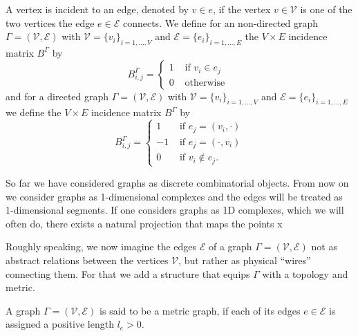 A vertex is incident to an edge, denoted by $v \in e$, if the vertex $v \in \mathcal{V}$ is one of the two vertices the edge $e \in \mathcal{E}$ connects. We define for an non-directed graph $\Gamma = (\mathcal{V}, \mathcal{E})$ with $\mathcal{V} = \{v_i\}_{i = 1, \ldots, V}$ and $\mathcal{E} = \{e_i\}_{i = 1, \ldots, E}$ the $V \times E$ incidence matrix $B^{\Gamma}$ by  
\begin{equation}
    \label{incidence matrix non-directed}
    B^{\Gamma}_{i, j}= \begin{cases} 1 & \text { if } v_i \in e_j \\ 0 & \text { otherwise } \end{cases}
\end{equation}
and for a directed graph $\Gamma = (\mathcal{V}, \mathcal{E})$ with $\mathcal{V} = \{v_i\}_{i = 1, \ldots, V}$ and $\mathcal{E} = \{e_i\}_{i = 1, \ldots, E}$ we define the $V \times E$ incidence matrix $B^{\Gamma}$ by 
\begin{equation}
    \label{incidence matrix directed}
    B^{\Gamma}_{i, j}= \begin{cases} 1 & \text { if } e_j = (v_i, \cdot) \\ -1 & \text { if } e_j = (\cdot, v_i) \\ 0 & \text { if } v_i \notin e_j. \end{cases}
\end{equation}


So far we have considered graphs as discrete combinatorial objects. From now on we consider graphs as 1-dimensional complexes and the edges will be treated as 1-dimensional segments. If one considers graphs as 1D complexes, which we will often do, there exists a natural projection that maps the points x


Roughly speaking, we now imagine the edges $\mathcal{E}$ of a graph $\Gamma = (\mathcal{V}, \mathcal{E})$ not as abstract relations between the vertices $\mathcal{V}$, but rather as physical “wires” connecting them. For that we add a structure that equips $\Gamma$ with a topology and metric. 

\begin{definition}\label{metric graph}
    A graph $\Gamma = (\mathcal{V}, \mathcal{E})$ is said to be a metric graph, if each of its edges $e \in \mathcal{E}$ is assigned a positive length $l_e > 0$.
\end{definition}


